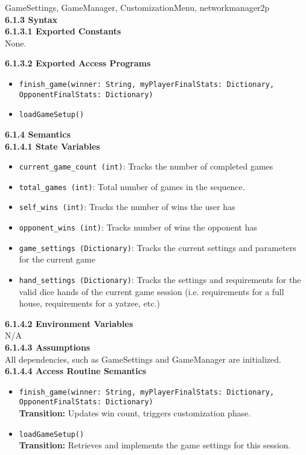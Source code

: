 \documentclass[12pt, titlepage]{article}
\begin{document}
GameSettings, GameManager, CustomizationMenu, networkmanager2p\\


\noindent \textbf{6.1.3 Syntax}\\
\textbf{6.1.3.1 Exported Constants}\\
None.  

\noindent \textbf{6.1.3.2 Exported Access Programs}
\begin{itemize}
    \item \texttt{finish\_game(winner: String, myPlayerFinalStats: Dictionary, OpponentFinalStats: Dictionary)}
    \item \texttt{loadGameSetup()}
\end{itemize}

\textbf{6.1.4 Semantics}\\
\textbf{6.1.4.1 State Variables}\\
\begin{itemize}
    \item \texttt{current\_game\_count (int)}: Tracks the number of completed games
    \item \texttt{total\_games (int)}: Total number of games in the sequence.
    \item \texttt{self\_wins (int)}: Tracks the number of wins the user has 
    \item \texttt{opponent\_wins (int)}: Tracks number of wins the opponent has
    \item \texttt{game\_settings (Dictionary)}: Tracks the current settings and parameters for the current game
    \item \texttt{hand\_settings (Dictionary)}: Tracks the settings and requirements for the valid dice hands of the current game session (i.e. requirements for a full house, requirements for a yatzee, etc.)

\end{itemize}

\textbf{6.1.4.2 Environment Variables}\\

N/A\\

\textbf{6.1.4.3 Assumptions}\\

All dependencies, such as GameSettings and GameManager are initialized.\\

\textbf{6.1.4.4 Access Routine Semantics}
\begin{itemize}

    \item \texttt{finish\_game(winner: String, myPlayerFinalStats: Dictionary, OpponentFinalStats: Dictionary)}\\
    \textbf{Transition:} Updates win count, triggers customization phase.
    
    \item \texttt{loadGameSetup()}\\
    \textbf{Transition:} Retrieves and implements the game settings for this session.

\end{itemize}
\end{document}
